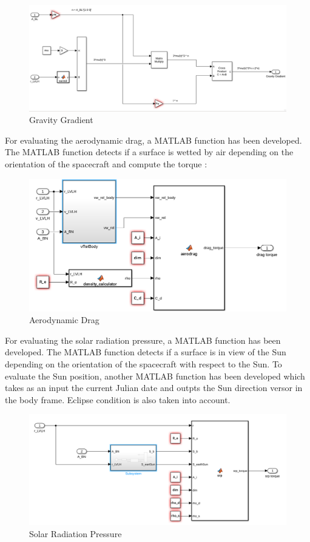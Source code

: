 \documentclass[11pt,a4paper]{report}
\begin{document}
\begin{figure}[H]
 \centering
 \includegraphics[scale=0.4]{gfx/simulink/gravitygradient.png}
 \caption{Gravity Gradient} 
 \label{fig:gravitygradient}
\end{figure}

For evaluating the aerodynamic drag, a MATLAB function has been developed. The MATLAB function detects if a surface is wetted by air depending on the orientation of the spacecraft and compute the torque :

\begin{figure}[H]
 \centering
 \includegraphics[scale=0.4]{gfx/simulink/aerodrag.png}
 \caption{Aerodynamic Drag} 
 \label{fig:aerodrag}
\end{figure}

For evaluating the solar radiation pressure, a MATLAB function has been developed. The MATLAB function detects if a surface is in view of the Sun depending on the orientation of the spacecraft with respect to the Sun. To evaluate the Sun position, another MATLAB function has been developed which takes as an input the current Julian date and outpts the Sun direction versor in the body frame. 
Eclipse condition is also taken into account.

\begin{figure}[H]
 \centering
 \includegraphics[scale=0.4]{gfx/simulink/srp.png}
 \caption{Solar Radiation Pressure} 
 \label{fig:srp}
\end{figure}
\end{document}
